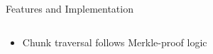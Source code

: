 \documentclass{beamer}
\begin{document}
\begin{frame}{Features and Implementation}
\begin{overlayarea}{\textwidth}{10cm}
\begin{columns}[t]
\begin{block}
{\begin{itemize}
       \item Chunk traversal follows Merkle-proof logic
      \end{itemize}
      }
    \end{block}
%      
\end{columns}
\end{overlayarea}
\end{frame}

% 
% 
%  
% 
%   
%   
% 
\end{document}
